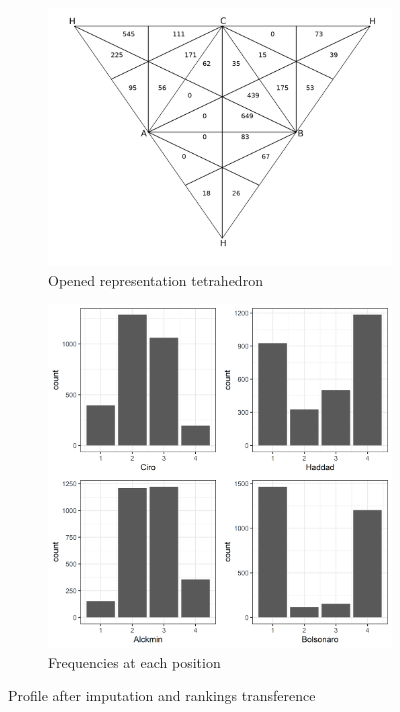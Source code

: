 \documentclass[hidelinks,11pt]{article} \usepackage[utf8]{inputenc}
\begin{document}
\begin{figure}[!h] \centering
  \begin{subfigure}[b]{0.49\textwidth} \centering
\includegraphics[width=\textwidth]{./images/representation_tetrahedron.png}
 \caption{Opened representation tetrahedron}
 \label{fig:rep_ot}
\end{subfigure} \hfill
  \begin{subfigure}[b]{0.49\textwidth} \centering
\includegraphics[width=\textwidth]{./images/corrected1_indexes_plot.png}
 \caption{Frequencies at each position}
 \label{fig:counts}
\end{subfigure}
\caption{Profile after imputation and rankings transference}
\label{fig:profile_trans}
\end{figure}
\end{document}
